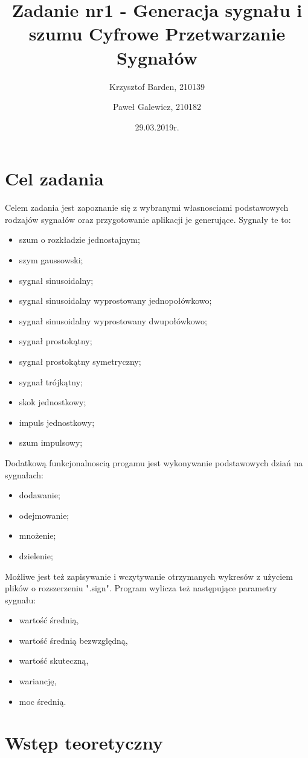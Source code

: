 \documentclass[12pt]{article}
\title{{\bf Zadanie nr1 - Generacja sygnału i
szumu}\linebreak
Cyfrowe Przetwarzanie Sygnałów}
\author{Krzysztof Barden, 210139 \and Paweł Galewicz, 210182}
\date{29.03.2019r.}
\begin{document}
\clearpage\maketitle
\thispagestyle{empty}
\newpage
\setcounter{page}{1}
\section{Cel zadania}

Celem zadania jest zapoznanie się z wybranymi własnosciami podstawowych
rodzajów sygnałów oraz przygotowanie aplikacji je generujące. Sygnały te to:
\begin{itemize}
\item szum o rozkładzie jednostajnym;
\item szym gaussowski;
\item sygnał sinusoidalny;
\item sygnał sinusoidalny wyprostowany jednopołówkowo;
\item sygnał sinusoidalny wyprostowany dwupołówkowo;
\item sygnał prostokątny;
\item sygnał prostokątny symetryczny;
\item sygnał trójkątny;
\item skok jednostkowy;
\item impuls jednostkowy;
\item szum impulsowy;
\end{itemize}
Dodatkową funkcjonalnoscią progamu jest wykonywanie podstawowych dziań na sygnałach:
\begin{itemize}
\item dodawanie;
\item odejmowanie;
\item mnożenie;
\item dzielenie;
\end{itemize}
Możliwe jest też zapisywanie i wczytywanie otrzymanych wykresów z użyciem plików o rozszerzeniu ".sign".
Program wylicza też następujące parametry sygnału:
\begin{itemize}
\item wartość średnią,
\item wartość średnią bezwzględną, 
\item wartość skuteczną, 
\item wariancję,
\item moc średnią.
\end{itemize}

\section{Wstęp teoretyczny}
\end{document}
